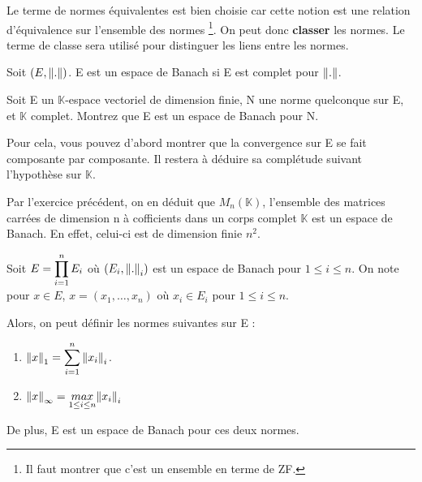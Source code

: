 Le terme de normes équivalentes est bien choisie car cette notion est une
relation d'équivalence sur l'ensemble des normes \footnote{Il faut montrer que
c'est un ensemble en terme de ZF.}.
On peut donc \textbf{classer} les normes. Le terme de classe sera utilisé pour
distinguer les liens entre les normes.

\begin{definition}
	Soit $(E, \norm{.})$. E est un espace de Banach si E est
	complet pour $\norm{.}$.
\end{definition}

\begin{exercice}
	Soit E un $\mathbb{K}$-espace vectoriel de dimension finie, N une norme
	quelconque sur E, et $\mathbb{K}$ complet.
	Montrez que E est un espace de Banach pour N.

	Pour cela, vous pouvez d'abord montrer que la convergence sur E se fait
	composante par composante. Il restera à déduire sa complétude suivant
	l'hypothèse sur $\mathbb{K}$.
\end{exercice}

\begin{exemple}
	Par l'exercice précédent, on en déduit que $M_{n}(\mathbb{K})$, l'ensemble
	des matrices carrées de dimension n à cofficients dans un corps complet
	$\mathbb{K}$ est un espace de Banach. En effet, celui-ci est de dimension
	finie $n^{2}$.
\end{exemple}


\begin{proposition}
	\label{product_norm_space}
	Soit $E = \displaystyle \prod_{i = 1}^{n} E_{i}$ où $(E_{i}, \norm{.}_{i})$
	est un espace de Banach pour $1 \leq i \leq n$.
	On note pour $x \in E$, $x = (x_{1}, \ldots, x_{n})$ où $x_{i} \in
	E_{i}$ pour $1 \leq i \leq n$.

	Alors, on peut définir les normes suivantes sur E :
	\begin{enumerate}
		\item $\norm{x}_{1} = \displaystyle \sum_{i = 1}^{n} \norm{x_{i}}_{i}$.
		\item $\norm{x}_{\infty} = \underset{1 \leq i \leq
			n}{max} \norm{x_{i}}_{i}$
	\end{enumerate}

	De plus, E est un espace de Banach pour ces deux normes.
\end{proposition}

